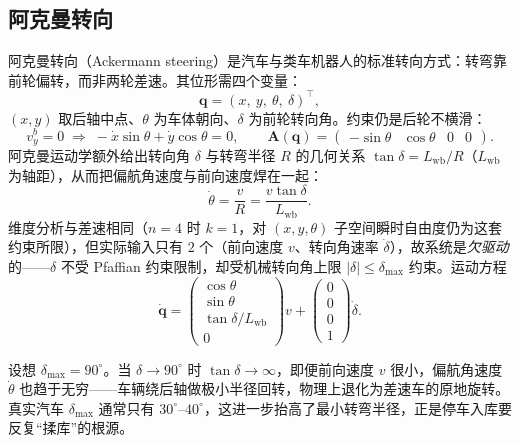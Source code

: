 \subsection{阿克曼转向}
\label{sec:mw-ackermann}

阿克曼转向（Ackermann steering）是汽车与类车机器人的标准转向方式：转弯靠前轮偏转，而非两轮差速。其位形需四个变量：
\begin{equation}
  \mathbf{q}=(x,\ y,\ \theta,\ \delta)^\top,
  \label{eq:mw-ack-q}
\end{equation}
$(x,y)$ 取后轴中点、$\theta$ 为车体朝向、$\delta$ 为前轮转向角。约束仍是后轮不横滑：
\begin{equation}
  v_y^b=0\;\Longrightarrow\;-\dot x\sin\theta+\dot y\cos\theta=0,\qquad
  \mathbf{A}(\mathbf{q})=\begin{pmatrix}-\sin\theta&\cos\theta&0&0\end{pmatrix}.
  \label{eq:mw-ack-A}
\end{equation}
阿克曼运动学额外给出转向角 $\delta$ 与转弯半径 $R$ 的几何关系 $\tan\delta=L_{\text{wb}}/R$（$L_{\text{wb}}$ 为轴距），从而把偏航角速度与前向速度焊在一起：
\begin{equation}
  \dot\theta=\frac{v}{R}=\frac{v\tan\delta}{L_{\text{wb}}}.
  \label{eq:mw-ack-yaw}
\end{equation}
维度分析与差速相同（$n=4$ 时 $k=1$，对 $(x,y,\theta)$ 子空间瞬时自由度仍为这套约束所限），但实际输入只有 $2$ 个（前向速度 $v$、转向角速率 $\dot\delta$），故系统是\emph{欠驱动}的——$\delta$ 不受 Pfaffian 约束限制，却受机械转向角上限 $|\delta|\le\delta_{\max}$ 约束。运动方程
\begin{equation}
  \dot{\mathbf{q}}=\begin{pmatrix}\cos\theta\\\sin\theta\\\tan\delta/L_{\text{wb}}\\0\end{pmatrix}v
  +\begin{pmatrix}0\\0\\0\\1\end{pmatrix}\dot\delta.
  \label{eq:mw-ack-vf}
\end{equation}

\begin{insight}\label{ins:mw-ackmax}
设想 $\delta_{\max}=90^\circ$。当 $\delta\to90^\circ$ 时 $\tan\delta\to\infty$，即便前向速度 $v$ 很小，偏航角速度 $\dot\theta$ 也趋于无穷——车辆绕后轴做极小半径回转，物理上退化为差速车的原地旋转。真实汽车 $\delta_{\max}$ 通常只有 $30^\circ$–$40^\circ$，这进一步抬高了最小转弯半径，正是停车入库要反复“揉库”的根源。
\end{insight}

